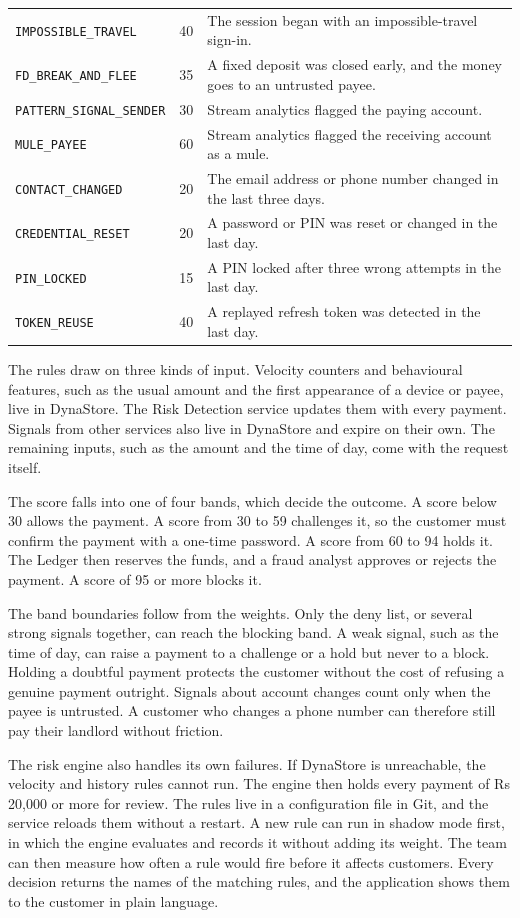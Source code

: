 \documentclass[11pt,a4paper]{article}
\newcommand{\code}[1]{\texttt{#1}}
\begin{document}
\begin{longtable}{@{}L{4.4cm}L{1.1cm}L{8.6cm}@{}}
\code{IMPOSSIBLE\_TRAVEL} & 40 & The session began with an impossible-travel sign-in. \\
\code{FD\_BREAK\_AND\_FLEE} & 35 & A fixed deposit was closed early, and the money goes to an untrusted payee. \\
\code{PATTERN\_SIGNAL\_SENDER} & 30 & Stream analytics flagged the paying account. \\
\code{MULE\_PAYEE} & 60 & Stream analytics flagged the receiving account as a mule. \\
\code{CONTACT\_CHANGED} & 20 & The email address or phone number changed in the last three days. \\
\code{CREDENTIAL\_RESET} & 20 & A password or PIN was reset or changed in the last day. \\
\code{PIN\_LOCKED} & 15 & A PIN locked after three wrong attempts in the last day. \\
\code{TOKEN\_REUSE} & 40 & A replayed refresh token was detected in the last day. \\
\bottomrule
\end{longtable}

The rules draw on three kinds of input. Velocity counters and behavioural features, such as the usual amount and the first appearance of a device or payee, live in DynaStore. The Risk Detection service updates them with every payment. Signals from other services also live in DynaStore and expire on their own. The remaining inputs, such as the amount and the time of day, come with the request itself.

The score falls into one of four bands, which decide the outcome. A score below 30 allows the payment. A score from 30 to 59 challenges it, so the customer must confirm the payment with a one-time password. A score from 60 to 94 holds it. The Ledger then reserves the funds, and a fraud analyst approves or rejects the payment. A score of 95 or more blocks it.

The band boundaries follow from the weights. Only the deny list, or several strong signals together, can reach the blocking band. A weak signal, such as the time of day, can raise a payment to a challenge or a hold but never to a block. Holding a doubtful payment protects the customer without the cost of refusing a genuine payment outright. Signals about account changes count only when the payee is untrusted. A customer who changes a phone number can therefore still pay their landlord without friction.

The risk engine also handles its own failures. If DynaStore is unreachable, the velocity and history rules cannot run. The engine then holds every payment of Rs 20,000 or more for review. The rules live in a configuration file in Git, and the service reloads them without a restart. A new rule can run in shadow mode first, in which the engine evaluates and records it without adding its weight. The team can then measure how often a rule would fire before it affects customers. Every decision returns the names of the matching rules, and the application shows them to the customer in plain language.
\end{document}
